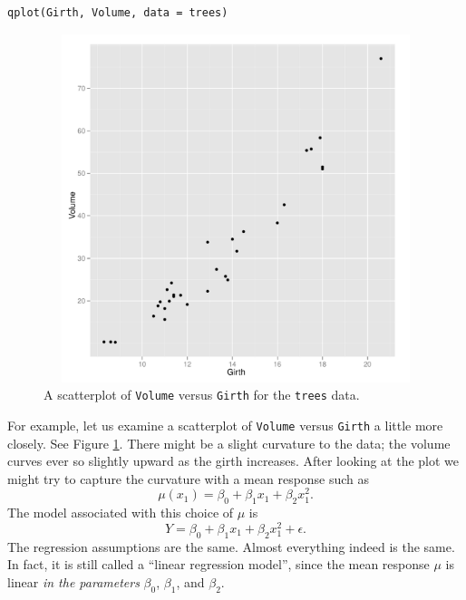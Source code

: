 \documentclass[captions=tableheading]{scrbook}
\begin{document}
\begin{verbatim}
qplot(Girth, Volume, data = trees)
\end{verbatim}



\begin{figure}[th]
    \includegraphics[width=5in, height=4in]{img/Scatterplot-Volume-Girth-trees.pdf}
    \caption[Scatterplot of \texttt{Volume} versus \texttt{Girth} for the \texttt{trees} data]{\small A scatterplot of \texttt{Volume} versus \texttt{Girth} for the \texttt{trees} data.}
    \label{fig:Scatterplot-Volume-Girth-trees}
  \end{figure}

For example, let us examine a scatterplot of \texttt{Volume} versus \texttt{Girth} a little more closely. See Figure \ref{fig:Scatterplot-Volume-Girth-trees}. There might be a slight curvature to the data; the volume curves ever so slightly upward as the girth increases. After looking at the plot we might try to capture the curvature with a mean response such as 
\begin{equation}
\mu(x_{1})=\beta_{0}+\beta_{1}x_{1}+\beta_{2}x_{1}^{2}.
\end{equation}
The model associated with this choice of \(\mu\) is
\begin{equation}
Y=\beta_{0}+\beta_{1}x_{1}+\beta_{2}x_{1}^{2}+\epsilon.
\end{equation}
The regression assumptions are the same. Almost everything indeed is the same. In fact, it is still called a ``linear regression model'', since the mean response \(\mu\) is linear \emph{in the parameters} \(\beta_{0}\), \(\beta_{1}\), and \(\beta_{2}\). 
\end{document}
